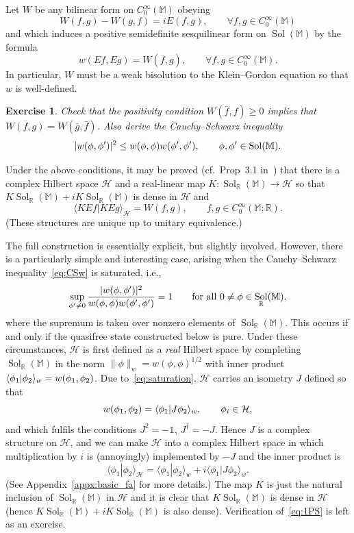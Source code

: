 \documentclass[12pt,a4paper]{article}
\let\Re\relax
\let\Im\relax
\DeclareMathOperator{\Re}{Re}
\DeclareMathOperator{\Im}{Im}
\newcommand{\1}{\mathds{1}}                         %
\newcommand{\RR}{\mathbb{R}}           %
\newcommand{\MM}{\mathbb{M}}
\newcommand{\HH}{{\mathcal{H}}}
\newcommand{\II}{{\mathbb{1}}}
\newcommand{\CoinX}[1]{C_0^\infty(#1)}
\newcommand{\ip}[2]{\langle #1|#2\rangle}
\newtheorem{exercise}[theorem]{Exercise}
\DeclareMathOperator{\Sol}{Sol}
\begin{document}
Let $W$ be any bilinear form on $\CoinX{\MM}$ obeying
\begin{equation}\label{eq:WE}
W(f,g) - W(g,f) = i E(f,g), \qquad \forall f,g\in\CoinX{\MM}
\end{equation}
and which induces a positive semidefinite sesquilinear form on $\Sol(\MM)$ by the formula 
\[
w(Ef,Eg) = W(\overline{f},g), \qquad \forall f,g\in\CoinX{\MM}.
\]  
In particular, $W$ must be a weak bisolution to the Klein--Gordon equation so that $w$ is well-defined. 
\begin{exercise}
Check that the positivity condition $W(\bar{f},f)\ge 0$ implies that 
$\overline{W(f,g)}=W(\bar{g},\bar{f})$. Also derive the Cauchy--Schwarz inequality
\begin{equation}\label{eq:CSw}
|\Im w(\phi,\phi')|^2 \le w(\phi,\phi)w(\phi',\phi'), \qquad \phi,\phi'\in\Sol(\MM).
\end{equation}
\end{exercise}

Under the above conditions, it may be proved (cf.~Prop~3.1 in~\cite{KayWald:1991}) that there is a complex Hilbert space $\HH$ and a real-linear map $K:\Sol_\RR(\MM)\to\HH$
so that $K\Sol_\RR(\MM)+iK\Sol_\RR(\MM)$ is dense in $\HH$ and
\begin{equation}\label{eq:1PS}
\ip{KEf}{KEg}_\HH = W(f,g),\qquad f,g\in\CoinX{\MM;\RR}.
\end{equation}
(These structures are unique up to unitary equivalence.)

The full construction is essentially explicit, but slightly involved. However, there is a particularly simple and interesting case, arising when the Cauchy--Schwarz inequality~\eqref{eq:CSw} is saturated, i.e.,
\begin{equation}\label{eq:saturation}
\sup_{\phi'\neq 0}\frac{|\Im w(\phi,\phi')|^2}{w(\phi,\phi)w(\phi',\phi')} = 1 \qquad\text{for all $0\neq \phi\in\Sol_{\RR}(\MM)$},
\end{equation}
where the supremum is taken over nonzero elements of $\Sol_\RR(\MM)$. This occurs if and only if the quasifree state constructed below is pure.
Under these circumstances, 
$\HH$ is first defined as a \emph{real} Hilbert space by completing $\Sol_\RR(\MM)$ in the norm $\|\phi\|_w=w(\phi,\phi)^{1/2}$ with inner product
$\ip{\phi_1}{\phi_2}_w=\Re w(\phi_1,\phi_2)$. 
Due to~\eqref{eq:saturation}, $\HH$ carries an isometry $J$ defined so that
\[
\Im w(\phi_1,\phi_2) = \ip{\phi_1}{J\phi_2}_w, \qquad \phi_i\in \HH,
\]
and which fulfils the conditions $J^2=-\II$, $J^\dagger =-J$. Hence $J$ is a complex structure on $\HH$, and we can make $\HH$ into a complex Hilbert space in which multiplication by $i$ is
(annoyingly) implemented by $-J$ and the inner product is
\[
\ip{\phi_1}{\phi_2}_\HH = \ip{\phi_1}{\phi_2}_w + i \ip{\phi_1}{J\phi_2}_w.
\] 
(See Appendix~\ref{appx:basic_fa} for more details.)
The map $K$ is just the natural inclusion of $\Sol_\RR(\MM)$ in $\HH$ and it is clear that $K\Sol_\RR(\MM)$ is dense in $\HH$ (hence $K\Sol_\RR(\MM)+iK\Sol_\RR(\MM)$ is also dense).
Verification of~\eqref{eq:1PS} is left as an exercise.  
\end{document}
